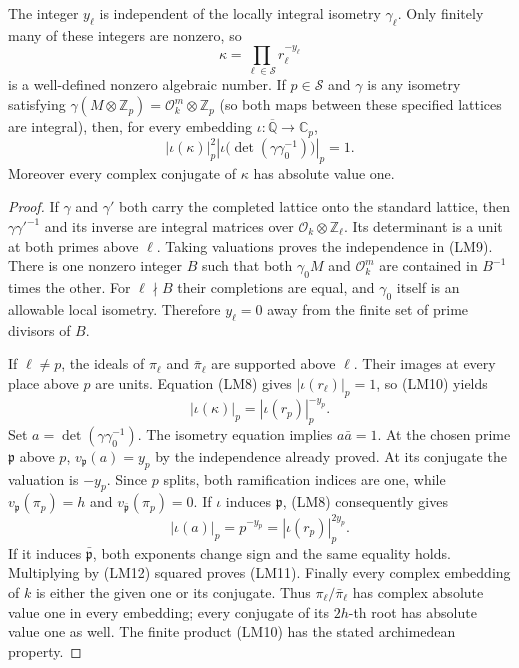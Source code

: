 \begin{theorem}\label{lm-kappa}
The integer $y_\ell$ is independent of the locally integral
isometry $\gamma_\ell$.  Only finitely many of these integers
are nonzero, so
\[
                         \kappa=\prod_{\ell\in\mathcal S}
                                         r_\ell^{-y_\ell}
 \tag{LM10}
\]
is a well-defined nonzero algebraic number.
If $p\in\mathcal S$ and $\gamma$ is any isometry satisfying
$\gamma(M\otimes\mathbb Z_p)=\mathcal O_k^m\otimes\mathbb Z_p$
(so both maps between these specified lattices are integral), then,
for every embedding $\iota:\overline{\mathbb Q}\to\mathbb C_p$,
\[
 |\iota(\kappa)|_p^2
  \left|\iota\bigl(\det(\gamma\gamma_0^{-1})\bigr)\right|_p=1.
 \tag{LM11}
\]
Moreover every complex conjugate of $\kappa$ has absolute value one.
\end{theorem}
\begin{proof}
If $\gamma$ and $\gamma'$ both carry the completed lattice
onto the standard lattice, then $\gamma\gamma'^{-1}$ and its
inverse are integral matrices over
$\mathcal O_k\otimes\mathbb Z_\ell$.  Its determinant is a
unit at both primes above $\ell$.  Taking valuations proves
the independence in (LM9).  There is one nonzero integer $B$
such that both $\gamma_0M$ and $\mathcal O_k^m$ are contained
in $B^{-1}$ times the other.  For $\ell\nmid B$ their
completions are equal, and $\gamma_0$ itself is an allowable
local isometry.  Therefore $y_\ell=0$ away from the finite
set of prime divisors of $B$.

If $\ell\ne p$, the ideals of $\pi_\ell$ and $\bar\pi_\ell$
are supported above $\ell$.  Their images at every place
above $p$ are units.  Equation (LM8) gives
$|\iota(r_\ell)|_p=1$, so (LM10) yields
\[
                   |\iota(\kappa)|_p
                        =|\iota(r_p)|_p^{-y_p}.
 \tag{LM12}
\]
Set $a=\det(\gamma\gamma_0^{-1})$.
The isometry equation implies $a\bar a=1$.
At the chosen prime $\mathfrak p$ above $p$,
$v_{\mathfrak p}(a)=y_p$ by the independence already proved.
At its conjugate the valuation is $-y_p$.
Since $p$ splits, both ramification indices are one, while
$v_{\mathfrak p}(\pi_p)=h$ and
$v_{\bar{\mathfrak p}}(\pi_p)=0$.
If $\iota$ induces $\mathfrak p$, (LM8) consequently gives
\[
 |\iota(a)|_p=p^{-y_p}
                   =|\iota(r_p)|_p^{2y_p}.
 \tag{LM13}
\]
If it induces $\bar{\mathfrak p}$, both exponents change sign
and the same equality holds.  Multiplying by (LM12) squared
proves (LM11).
Finally every complex embedding of $k$ is either the given
one or its conjugate.  Thus $\pi_\ell/\bar\pi_\ell$ has
complex absolute value one in every embedding; every conjugate
of its $2h$-th root has absolute value one as well.  The finite
product (LM10) has the stated archimedean property.
\end{proof}

